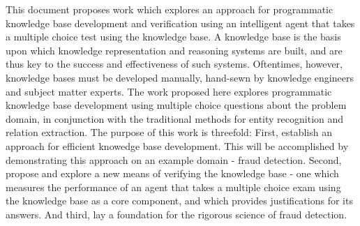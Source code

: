  
 
This document proposes work which explores an approach for programmatic knowledge base development
and verification using an intelligent agent that takes a multiple choice test using the knowledge base.
A knowledge base is the basis upon which knowledge representation and reasoning systems are built, 
and are thus key to the success and effectiveness of such systems.  Oftentimes, however, knowledge
bases must be developed manually, hand-sewn by knowledge engineers and subject matter experts.
The work proposed here explores programmatic knowledge base development using multiple choice questions about the problem domain, in conjunction with
the traditional methods for entity recognition and
relation extraction.  The purpose of this work is threefold: First, establish an approach for efficient 
knowedge base development.  This will be accomplished by demonstrating this approach on an example domain - fraud detection.  Second, propose and explore a new means of verifying the knowledge base - one which
measures the performance of an agent that takes a multiple choice exam using the knowledge base as a core component, and which provides justifications for its answers.  And third, lay a foundation
for the rigorous science of fraud detection.



